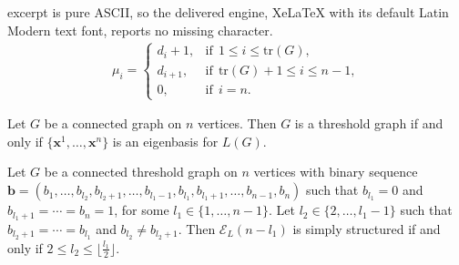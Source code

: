 \documentclass[10pt,a4paper]{amsart}
\begin{document}
excerpt is pure ASCII, so the delivered engine, XeLaTeX with its default Latin Modern text font, reports no missing character.
    \begin{align}\label{spectrum  threshold}
    \mu_i = \left\{\begin{array}{rll}
        d_i +1,  & \text{if} \ \ 1 \leq i\leq \text{tr}(G),\\
        d_{i+1}, & \text{if} \ \ \text{tr}(G) + 1 \leq i \leq n-1,\\
        0,       & \text{if} \ \ i =n.
    \end{array}\right.
    \end{align}

\begin{theorem}
 \label{TeoPrincipal} 
Let $G$ be a connected graph on $n$ vertices. Then $G$ is a threshold graph if and only if  $\{\mathbf{x}^{1}, \ldots, \mathbf{x}^{n}\}$ is an eigenbasis for $L(G)$. 
\end{theorem}

\begin{proposition}\label{prop:n-k}
   Let $G$ be a connected threshold graph on $n$ vertices with binary sequence $\mathbf{b}=(b_1, \ldots, b_{l_2}, b_{l_2+1}, \ldots, b_{l_1-1}, b_{l_1}, b_{l_1+1}, \ldots, b_{n-1}, b_{n})$ such that $b_{l_1}=0$ and $b_{l_1+1}=\cdots=b_{n}=1$, for some $l_1 \in \{1,\ldots, n-1\}$. Let $l_2\in \{2, \ldots, l_1-1\}$ such that 
   $b_{l_2+1}=\cdots=b_{l_1}$ and $b_{l_2}\neq b_{l_2+1}$. Then $\mathcal{E}_{L}(n-l_1)$ is simply structured if and only if $2\leq l_2 \leq \lfloor \frac{l_1}{2} \rfloor$.
\end{proposition}
\end{document}
